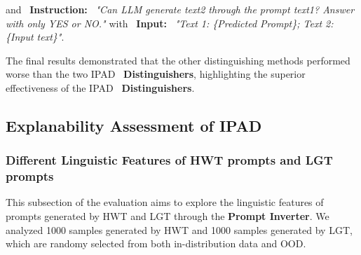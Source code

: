 and ~\textbf{Instruction:} ~\textit{"Can LLM generate text2 through the prompt text1? Answer with only YES or NO."} with ~\textbf{Input:} ~\textit{"Text 1: \{Predicted Prompt\}; Text 2: \{Input text\}"}.

The final results demonstrated that the other distinguishing methods performed worse than the two IPAD ~\textbf{Distinguishers}, highlighting the superior effectiveness of the IPAD ~\textbf{Distinguishers}.


\begin{table}[ht]
\centering
{}
\caption{Comparison of Different Distinguishers, where ~\textbf{IPAD version1} stands for ~\textbf{IPAD with ~\textit{Prompt-Text Consistency Verifier}} and ~\textbf{IPAD version2} stands for ~\textbf{IPAD with ~\textit{Regeneration Comparator}.}}
\label{tab:distinguishers_comparison}
\end{table}
\vspace{-0.3cm}





\subsection{Explanability Assessment of IPAD}
\subsubsection{Different Linguistic Features of HWT prompts and LGT prompts}

This subsection of the evaluation aims to explore the linguistic features of prompts generated by HWT and LGT through the \textbf{Prompt Inverter}. We analyzed 1000 samples generated by HWT and 1000 samples generated by LGT, which are randomy selected from both in-distribution data and OOD.

